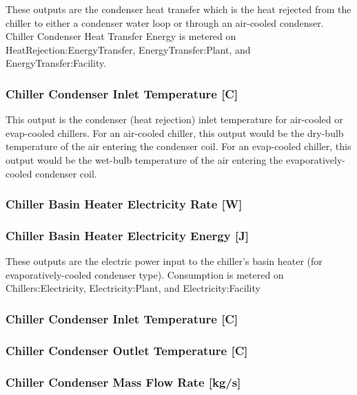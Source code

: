 These outputs are the condenser heat transfer which is the heat rejected from the chiller to either a condenser water loop or through an air-cooled condenser. Chiller Condenser Heat Transfer Energy is metered on HeatRejection:EnergyTransfer, EnergyTransfer:Plant, and EnergyTransfer:Facility.

\subsubsection{Chiller Condenser Inlet Temperature {[}C{]}}\label{chiller-condenser-inlet-temperature-c}

This output is the condenser (heat rejection) inlet temperature for air-cooled or evap-cooled chillers. For an air-cooled chiller, this output would be the dry-bulb temperature of the air entering the condenser coil. For an evap-cooled chiller, this output would be the wet-bulb temperature of the air entering the evaporatively-cooled condenser coil.

\subsubsection{Chiller Basin Heater Electricity Rate {[}W{]}}\label{chiller-basin-heater-electric-power-w}

\subsubsection{Chiller Basin Heater Electricity Energy {[}J{]}}\label{chiller-basin-heater-electric-energy-j}

These outputs are the electric power input to the chiller's basin heater (for evaporatively-cooled condenser type). Consumption is metered on Chillers:Electricity, Electricity:Plant, and Electricity:Facility

\subsubsection{Chiller Condenser Inlet Temperature {[}C{]}}\label{chiller-condenser-inlet-temperature-c-1}

\subsubsection{Chiller Condenser Outlet Temperature {[}C{]}}\label{chiller-condenser-outlet-temperature-c}

\subsubsection{Chiller Condenser Mass Flow Rate {[}kg/s{]}}\label{chiller-condenser-mass-flow-rate-kgs}


